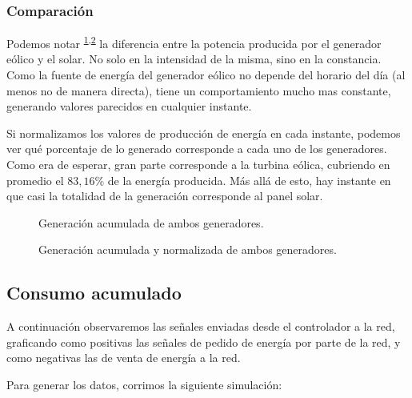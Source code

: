 \hypertarget{quuxe9-generador-vale-muxe1s}{%
\subsubsection{Comparación}\label{quuxe9-generador-vale-muxe1s}}

Podemos notar \textsuperscript{\ref{fig:simu3:1},\ref{fig:simu3:2}} la diferencia entre la potencia producida por el generador
eólico y el solar. No solo en la intensidad de la misma, sino en la
constancia. Como la fuente de energía del generador eólico no depende
del horario del día (al menos no de manera directa), tiene un
comportamiento mucho mas constante, generando valores parecidos en
cualquier instante.

Si normalizamos los valores de producción de energía en cada instante,
podemos ver qué porcentaje de lo generado corresponde a cada uno de los
generadores. Como era de esperar, gran parte corresponde a la turbina
eólica, cubriendo en promedio el \(83,16\%\) de la energía producida.
Más allá de esto, hay instante en que casi la totalidad de la
generación corresponde al panel solar. 

\begin{figure}[H]
    \begin{center}
    \end{center}
    \caption{Generación acumulada de ambos generadores.}\label{fig:simu3:1}
\end{figure}

\begin{figure}[H]
    \begin{center}
    \end{center}
    \caption{Generación acumulada y normalizada de ambos generadores.}\label{fig:simu3:2}
\end{figure}

\subsection{Consumo acumulado}
A continuación observaremos las señales enviadas desde el controlador a la red, graficando
como positivas las señales de pedido de energía por parte de la red, y como negativas las
de venta de energía a la red.

Para generar los datos, corrimos la siguiente simulación:

